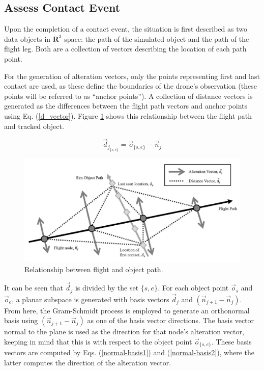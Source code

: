 \documentclass[conf]{new-aiaa}
\begin{document}
\subsection{Assess Contact Event}

Upon the completion of a contact event, the situation is first described as two data objects in $\mathbf{R}^3$ space: the path of the simulated object and the path of the flight leg. Both are a collection of vectors describing the location of each path point.

For the generation of alteration vectors, only the points representing first and last contact are used, as these define the boundaries of the drone's observation (these points will be referred to as ``anchor points''). A collection of distance vectors is generated as the differences between the flight path vectors and anchor points using Eq. (\ref{d_vector}). Figure \ref{heuristic-diagram} shows this relationship between the flight path and tracked object.

\begin{equation}
\label{d_vector}
\vec{d}_{j_{\{s, e\}}} = \vec{o}_{\{s, e\}} - \vec{n}_j
\end{equation}

\begin{figure}[hbt!]
\centering
\includegraphics[width=1\textwidth]{figs/heuristic-diagram}
\caption{Relationship between flight and object path.}
\label{heuristic-diagram}
\end{figure}

It can be seen that $\vec{d}_j$ is divided by the set $\{s, e\}$. For each object point $\vec{o}_s$ and $\vec{o}_e$, a planar subspace is generated with basis vectors $\vec{d}_j$ and $(\vec{n}_{j + 1} - \vec{n}_j)$. From here, the Gram-Schmidt process is employed to generate an orthonormal basis using $(\vec{n}_{j + 1} - \vec{n}_j)$ as one of the basis vector directions. The basis vector normal to the plane is used as the direction for that node's alteration vector, keeping in mind that this is with respect to the object point $\vec{o}_{\{s, e\}}$. These basis vectors are computed by Eqs. (\ref{normal-basis1}) and (\ref{normal-basis2}), where the latter computes the direction of the alteration vector.
\end{document}
